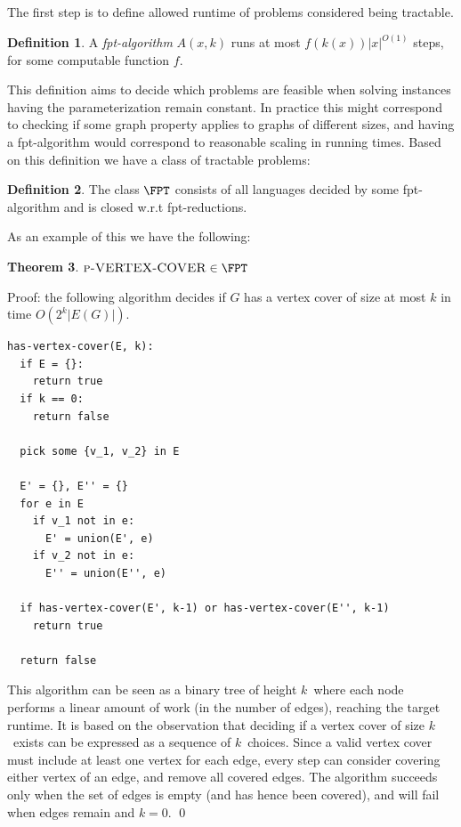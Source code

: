 \documentclass[a4paper,11pt,notitlepage]{report}
\theoremstyle{plain}
\newtheorem{thm}{Theorem}[chapter] %
\theoremstyle{definition}
\newtheorem{defn}[thm]{Definition} %
\begin{document}
The first step is to define allowed runtime of problems considered being tractable.

\begin{defn}
A \emph{fpt-algorithm} $A(x, k)$ runs at most $f(k(x)) |x|^{O(1)}$ steps, for some computable function $f$.
\end{defn}

This definition aims to decide which problems are feasible when solving instances having the parameterization remain constant.
In practice this might correspond to checking if some graph property applies to graphs of different sizes, and having a fpt-algorithm
would correspond to reasonable scaling in running times.
Based on this definition we have a class of tractable problems:

\begin{defn}
The class $\FPT$ consists of all languages decided by some fpt-algorithm and is closed w.r.t fpt-reductions.
\end{defn}

As an example of this we have the following:
\begin{thm}
$\textsc{p-VERTEX-COVER} \in \FPT$
\end{thm}

Proof: the following algorithm decides if $G$ has a vertex cover of size at most $k$ in time $O(2^k |E(G)|)$.
\begin{verbatim}
has-vertex-cover(E, k):
  if E = {}:
    return true
  if k == 0:
    return false

  pick some {v_1, v_2} in E
  
  E' = {}, E'' = {}
  for e in E
    if v_1 not in e:
      E' = union(E', e)
    if v_2 not in e:
      E'' = union(E'', e)

  if has-vertex-cover(E', k-1) or has-vertex-cover(E'', k-1)
    return true

  return false

\end{verbatim}

This algorithm can be seen as a binary tree of height $k$ where each node performs a linear amount of work (in the number of edges), reaching the target runtime.
It is based on the observation that deciding if a vertex cover of size $k$ exists can be expressed as a sequence of $k$ choices.
Since a valid vertex cover must include at least one vertex for each edge, every step can consider covering either vertex of an edge, and remove all covered edges.
The algorithm succeeds only when the set of edges is empty (and has hence been covered), and will fail when edges remain and $k = 0$. \qed
\\
\end{document}
